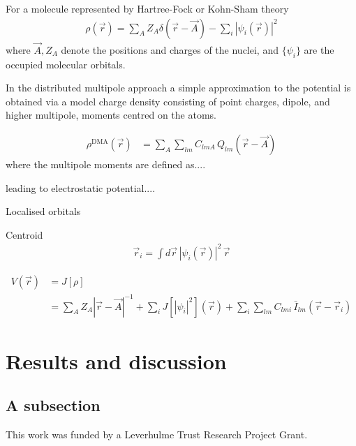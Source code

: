 \documentclass[journal=jacsat,manuscript=article]{achemso}
\begin{document}
For a molecule represented by Hartree-Fock or Kohn-Sham theory
\begin{align}
    \rho(\vec r) = \sum_A Z_A \delta(\vec r - \vec A)
    -\sum_i |\psi_i(\vec r)|^2
\end{align}
where $\vec A, Z_A$ denote the positions and charges of the nuclei, and
$\{\psi_i\}$ are the occupied molecular orbitals.

In the distributed multipole approach a simple approximation to the potential is
obtained via  a model charge density consisting of point charges, dipole, and higher multipole, moments centred on the atoms.

\begin{align}
    \rho^{\text{DMA}}(\vec r)
    &=
    \sum_A \sum_{lm} C_{lmA} \,Q_{lm}(\vec r - \vec A)
\end{align}
where the multipole moments are defined as....

leading to electrostatic potential....

Localised orbitals

Centroid
\begin{align}
  \vec r_i = \int d \vec r \,|\psi_i(\vec r)|^2 \,  \vec r
\end{align}

\begin{align}
    V(\vec r) &=J[\rho]\\& =
    \sum_A Z_A |\vec r
    - \vec A|^{-1}+\sum_i J[|\psi_i|^2](\vec r)
    +\sum_i \sum_{lm} C_{lmi}\,\bar I_{lm}(\vec r - \vec r_i)
\end{align}
\section{Results and discussion}

\subsection{A subsection}

\begin{acknowledgement}

This work was funded by a Leverhulme Trust Research Project Grant.

\end{acknowledgement}
\end{document}
